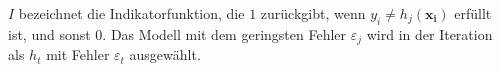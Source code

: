 

$I$ bezeichnet die Indikatorfunktion, die $1$ zurückgibt, wenn $y_i\neq h_j(\boldsymbol{x_i})$ erfüllt ist, und
sonst $0$.
Das Modell mit dem geringsten Fehler $\varepsilon_j$ wird in der Iteration als $h_t$ mit Fehler $\varepsilon_t$ ausgewählt.